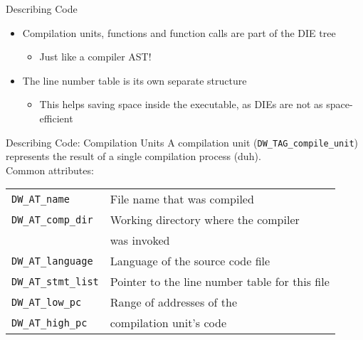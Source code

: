 \begin{frame}{Describing Code}
\begin{itemize}
\item Compilation units, functions and function calls are part of the DIE tree
	\begin{itemize}
	\item Just like a compiler AST!
	\end{itemize}
\medskip
\item The line number table is its own separate structure
	\begin{itemize}
	\item This helps saving space inside the executable, as DIEs are not as space-efficient
	\end{itemize}
\end{itemize}
\end{frame}


\begin{frame}{Describing Code: Compilation Units}
A compilation unit (\texttt{DW\_TAG\_compile\_unit}) represents the result of a single compilation process (duh).\\
\medskip
Common attributes:\\
\medskip
\begin{tabular}{ l l }
\texttt{DW\_AT\_name} & File name that was compiled \\
\texttt{DW\_AT\_comp\_dir} & Working directory where the compiler\\
& was invoked \\
\texttt{DW\_AT\_language} & Language of the source code file \\
\texttt{DW\_AT\_stmt\_list} & Pointer to the line number table for this file \medskip \\

\texttt{DW\_AT\_low\_pc} & Range of addresses of the \\
\texttt{DW\_AT\_high\_pc} & compilation unit's code \\
\end{tabular}\\
\end{frame}


